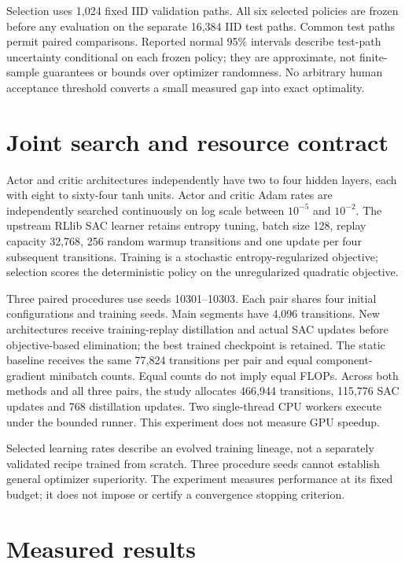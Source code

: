 Selection uses 1,024 fixed IID validation paths. All six selected policies are
frozen before any evaluation on the separate 16,384 IID test paths. Common
test paths permit paired comparisons. Reported normal 95\% intervals describe
test-path uncertainty conditional on each frozen policy; they are approximate,
not finite-sample guarantees or bounds over optimizer randomness. No arbitrary
human acceptance threshold converts a small measured gap into exact optimality.

\section{Joint search and resource contract}
Actor and critic architectures independently have two to four hidden layers,
each with eight to sixty-four tanh units. Actor and critic Adam rates are
independently searched continuously on log scale between $10^{-5}$ and $10^{-2}$.
The upstream RLlib SAC learner retains entropy tuning, batch size 128, replay
capacity 32,768, 256 random warmup transitions and one update per four subsequent
transitions. Training is a stochastic entropy-regularized objective; selection
scores the deterministic policy on the unregularized quadratic objective.

Three paired procedures use seeds 10301--10303. Each pair shares four initial
configurations and training seeds. Main segments have 4,096 transitions. New
architectures receive training-replay distillation and actual SAC updates
before objective-based elimination; the best trained checkpoint is retained.
The static baseline receives the same 77,824 transitions per pair and equal
component-gradient minibatch counts. Equal counts do not imply equal FLOPs.
Across both methods and all three pairs, the study allocates 466,944 transitions,
115,776 SAC updates and 768 distillation updates. Two single-thread CPU workers
execute under the bounded runner. This experiment does not measure GPU speedup.

Selected learning rates describe an evolved training lineage, not a separately
validated recipe trained from scratch. Three procedure seeds cannot establish
general optimizer superiority. The experiment measures performance at its
fixed budget; it does not impose or certify a convergence stopping criterion.

\section{Measured results}

